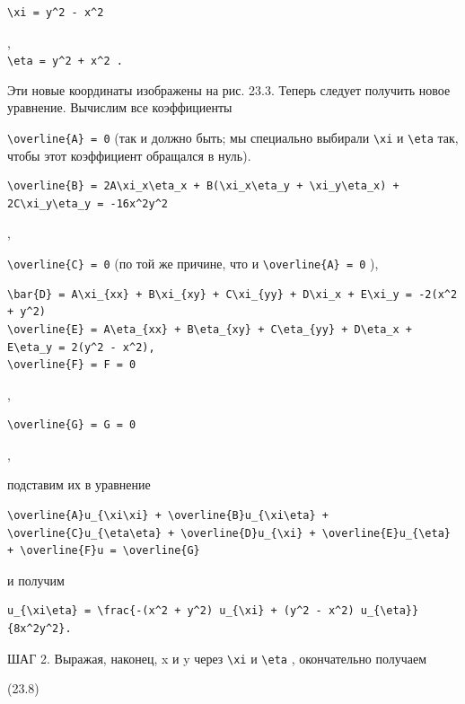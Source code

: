 \documentclass[
  ukrainian,
]{article}
\begin{document}
\begin{verbatim}
\xi = y^2 - x^2
\end{verbatim}

,\\
\texttt{\textquotesingle{}\textbackslash{}eta\ =\ y\^{}2\ +\ x\^{}2\textquotesingle{}\ .}

Эти новые координаты изображены на рис. 23.3. Теперь следует получить
новое уравнение. Вычислим все коэффициенты

\texttt{\textbackslash{}overline\{A\}\ =\ 0} (так и должно быть; мы
специально выбирали \texttt{\textbackslash{}xi} и
\texttt{\textbackslash{}eta} так, чтобы этот коэффициент обращался в
нуль).

\begin{verbatim}
\overline{B} = 2A\xi_x\eta_x + B(\xi_x\eta_y + \xi_y\eta_x) + 2C\xi_y\eta_y = -16x^2y^2
\end{verbatim}

,

\texttt{\textbackslash{}overline\{C\}\ =\ 0} (по той же причине, что и
\texttt{\textbackslash{}overline\{A\}\ =\ 0} ),

\begin{verbatim}
\bar{D} = A\xi_{xx} + B\xi_{xy} + C\xi_{yy} + D\xi_x + E\xi_y = -2(x^2 + y^2)
\overline{E} = A\eta_{xx} + B\eta_{xy} + C\eta_{yy} + D\eta_x + E\eta_y = 2(y^2 - x^2),
\overline{F} = F = 0
\end{verbatim}

,

\begin{verbatim}
\overline{G} = G = 0
\end{verbatim}

,

подставим их в уравнение

\begin{verbatim}
\overline{A}u_{\xi\xi} + \overline{B}u_{\xi\eta} + \overline{C}u_{\eta\eta} + \overline{D}u_{\xi} + \overline{E}u_{\eta} + \overline{F}u = \overline{G}
\end{verbatim}

и получим

\begin{verbatim}
u_{\xi\eta} = \frac{-(x^2 + y^2) u_{\xi} + (y^2 - x^2) u_{\eta}}{8x^2y^2}.
\end{verbatim}

ШАГ 2. Выражая, наконец, x и y через \texttt{\textbackslash{}xi} и
\texttt{\textbackslash{}eta} , окончательно получаем

(23.8)
\end{document}
